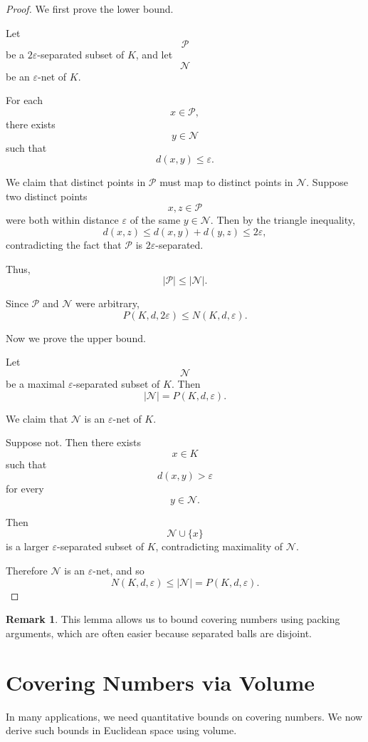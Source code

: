 \documentclass[12pt,oneside]{book}
\numberwithin{equation}{section}
\theoremstyle{definition}
\newtheorem{remark}{Remark}[section]
\theoremstyle{plain}
\theoremstyle{remark}
\begin{document}
\begin{proof}
We first prove the lower bound.

Let
\[
\mathcal{P}
\]
be a $2\varepsilon$-separated subset of $K$, and let
\[
\mathcal{N}
\]
be an $\varepsilon$-net of $K$.

For each
\[
x\in\mathcal{P},
\]
there exists
\[
y\in\mathcal{N}
\]
such that
\[
d(x,y)\leq \varepsilon.
\]

We claim that distinct points in $\mathcal{P}$ must map to distinct points in $\mathcal{N}$. Suppose two distinct points
\[
x,z\in\mathcal{P}
\]
were both within distance $\varepsilon$ of the same $y\in\mathcal{N}$. Then by the triangle inequality,
\[
d(x,z)
\leq
d(x,y)+d(y,z)
\leq
2\varepsilon,
\]
contradicting the fact that $\mathcal{P}$ is $2\varepsilon$-separated.

Thus,
\[
|\mathcal{P}|\leq |\mathcal{N}|.
\]

Since $\mathcal{P}$ and $\mathcal{N}$ were arbitrary,
\[
P(K,d,2\varepsilon)
\leq
N(K,d,\varepsilon).
\]

Now we prove the upper bound.

Let
\[
\mathcal{N}
\]
be a maximal $\varepsilon$-separated subset of $K$. Then
\[
|\mathcal{N}|=P(K,d,\varepsilon).
\]

We claim that $\mathcal{N}$ is an $\varepsilon$-net of $K$.

Suppose not. Then there exists
\[
x\in K
\]
such that
\[
d(x,y)>\varepsilon
\]
for every
\[
y\in\mathcal{N}.
\]

Then
\[
\mathcal{N}\cup\{x\}
\]
is a larger $\varepsilon$-separated subset of $K$, contradicting maximality of $\mathcal{N}$.

Therefore $\mathcal{N}$ is an $\varepsilon$-net, and so
\[
N(K,d,\varepsilon)
\leq
|\mathcal{N}|
=
P(K,d,\varepsilon).
\]
\end{proof}

\begin{remark}
This lemma allows us to bound covering numbers using packing arguments, which are often easier because separated balls are disjoint.
\end{remark}

\section{Covering Numbers via Volume}

In many applications, we need quantitative bounds on covering numbers. We now derive such bounds in Euclidean space using volume.
\end{document}
